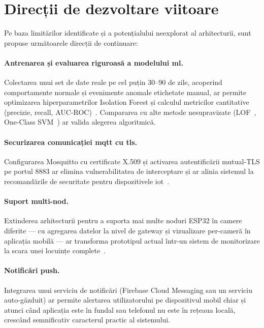 \section{Direcții de dezvoltare viitoare}

Pe baza limitărilor identificate și a potențialului neexplorat al
arhitecturii, sunt propuse următoarele direcții de continuare:

\paragraph{Antrenarea și evaluarea riguroasă a modelului \gls{ml}.}
Colectarea unui set de date reale pe cel puțin 30–90 de zile, acoperind
comportamente normale și evenimente anomale etichetate manual, ar permite
optimizarea hiperparametrilor Isolation Forest și calculul metricilor
cantitative (precizie, recall, AUC-ROC)~\cite{davis2006prcurve,fawcett2006roc,
cook2020anomalyiot}.  Compararea cu alte metode nesupravizate (LOF~\cite{breunig2000lof},
One-Class SVM~\cite{scholkopf2001ocsvm}) ar valida alegerea algoritmică.

\paragraph{Securizarea comunicației \gls{mqtt} cu \gls{tls}.}  Configurarea
Mosquitto cu certificate X.509 și activarea autentificării mutual-TLS pe
portul 8883 ar elimina vulnerabilitatea de interceptare și ar alinia sistemul
la recomandările de securitate pentru dispozitivele \gls{iot}~\cite{alrawi2019sokhome}.

\paragraph{Suport multi-nod.}  Extinderea arhitecturii pentru a suporta mai
multe noduri ESP32 în camere diferite — cu agregarea datelor la nivel de
gateway și vizualizare per-cameră în aplicația mobilă — ar transforma
prototipul actual într-un sistem de monitorizare la scara unei locuințe
complete~\cite{stojkoska2017smarthome}.

\paragraph{Notificări push.}  Integrarea unui serviciu de notificări
(Firebase Cloud Messaging sau un serviciu auto-găzduit) ar permite alertarea
utilizatorului pe dispozitivul mobil chiar și atunci când aplicația este în
fundal sau telefonul nu este în rețeaua locală, crescând semnificativ
caracterul practic al sistemului.

